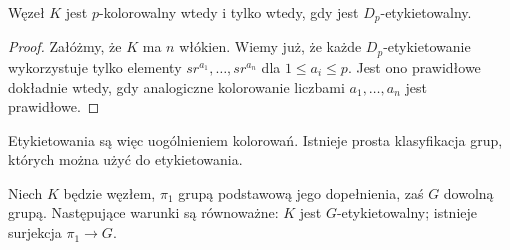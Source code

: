 \begin{proposition}
	Węzeł $K$ jest $p$-kolorowalny wtedy i tylko wtedy, gdy jest $D_p$-etykietowalny.
\end{proposition}

\begin{proof}
	Załóżmy, że $K$ ma $n$ włókien.
	Wiemy już, że każde $D_p$-etykietowanie wykorzystuje tylko elementy $sr^{a_1}, \ldots, sr^{a_n}$ dla $1 \le a_i \le p$.
	Jest ono prawidłowe dokładnie wtedy, gdy analogiczne kolorowanie liczbami $a_1, \ldots, a_n$ jest prawidłowe.
\end{proof}

Etykietowania są więc uogólnieniem kolorowań.
Istnieje prosta klasyfikacja grup, których można użyć do etykietowania.

\begin{proposition}
	Niech $K$ będzie węzłem, $\pi_1$ grupą podstawową jego dopełnienia, zaś $G$ dowolną grupą.
	Następujące warunki są równoważne: $K$ jest $G$-etykietowalny; istnieje surjekcja $\pi_1 \to G$.
\end{proposition}

